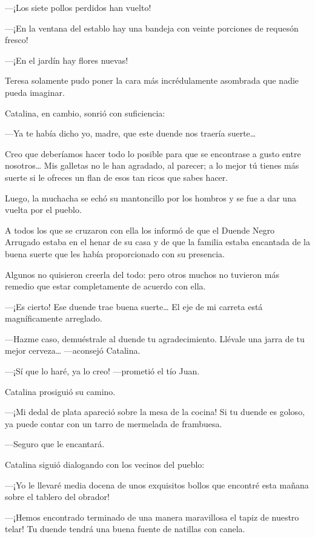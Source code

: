 \documentclass{barcodevapor3pags}
\begin{document}
---¡Los siete pollos perdidos han vuelto!

---¡En la ventana del establo hay una bandeja con veinte porciones de
requesón fresco!

---¡En el jardín hay flores nuevas!

Teresa solamente pudo poner la cara más incrédulamente asombrada que
nadie pueda imaginar.

Catalina, en cambio, sonrió con suficiencia:

---Ya te había dicho yo, madre, que este duende nos traería
suerte\ldots{}

Creo que deberíamos hacer todo lo posible para que se encontrase a gusto
entre nosotros\ldots{} Mis galletas no le han agradado, al parecer; a lo
mejor tú tienes más suerte si le ofreces un flan de esos tan ricos que
sabes hacer.

Luego, la muchacha se echó su mantoncillo por los hombros y se fue a dar
una vuelta por el pueblo.

A todos los que se cruzaron con ella los informó de que el Duende Negro
Arrugado estaba en el henar de su casa y de que la familia estaba
encantada de la buena suerte que les había proporcionado con su
presencia.

Algunos no quisieron creerla del todo: pero otros muchos no tuvieron más
remedio que estar completamente de acuerdo con ella.

---¡Es cierto! Ese duende trae buena suerte\ldots{} El eje de mi carreta
está magníficamente arreglado.

---Hazme caso, demuéstrale al duende tu agradecimiento. Llévale una
jarra de tu mejor cerveza\ldots{} ---aconsejó Catalina.

---¡Sí que lo haré, ya lo creo! ---prometió el tío Juan.

Catalina prosiguió su camino.

---¡Mi dedal de plata apareció sobre la mesa de la cocina! Si tu duende
es goloso, ya puede contar con un tarro de mermelada de frambuesa.

---Seguro que le encantará.

Catalina siguió dialogando con los vecinos del pueblo:

---¡Yo le llevaré media docena de unos exquisitos bollos que encontré
esta mañana sobre el tablero del obrador!

---¡Hemos encontrado terminado de una manera maravillosa el tapiz de
nuestro telar! Tu duende tendrá una buena fuente de natillas con canela.
\end{document}
